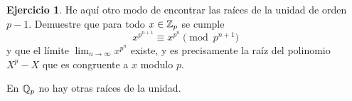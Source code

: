 \documentclass{article}
\numberwithin{equation}{section}
\theoremstyle{definition}
\newtheorem{ejerc}{Ejercicio}
\newif\ifsolutions
\begin{document}
\begin{ejerc}
  He aquí otro modo de encontrar las raíces de la unidad de orden
  $p-1$. Demuestre que para todo $x\in\mathbb{Z}_p$ se cumple
  $$x^{p^{n+1}} \equiv x^{p^n} \pmod{p^{n+1}}$$
  y que el límite $\lim_{n\to\infty} x^{p^n}$ existe, y es precisamente la raíz
  del polinomio $X^p - X$ que es congruente a $x$ modulo $p$.

  \ifsolutions\begin{solucion}
    Primero, por el pequeño teorema de Fermat,
    $$x^p \equiv x \pmod{p}.$$
    Esto implica que
    $$x^{p^{n+1}} = (x^p)^{p^n} \equiv x^{p^n} \pmod{p^{n+1}}$$
    para todo $n = 1,2,3,\ldots$ En términos de normas
    $p$-ádicas, tenemos desigualdades
    $$|x^{p^{n+1}} - x^{p^n}|_p \le \frac{1}{p^{n+1}},$$
    lo que demuestra que la sucesión es de Cauchy y su límite
    $$y = \lim_{n\to\infty} x^{p^n}$$
    existe. Tenemos $y^n = y$. En efecto,
    \[ y^p - y =
       \left(\lim_{n\to\infty} x^{p^n}\right)^p - \lim_{n\to\infty} x^{p^n} =
       \lim_{n\to\infty} (x^{p^n})^p - \lim_{n\to\infty} x^{p^n} =
       \lim_{n\to\infty} (x^{p^{n+1}} - x^{p^n}) = 0 \]
    por lo que acabamos de ver. Ahora para todo $n$
    $$x^{p^n} \equiv x \pmod{p}.$$
    ---si $n = 1$, es el pequeño teorema de Fermat, y luego por inducción
    $$x^{p^n} = (x^{p^{n-1}})^p \equiv x^p \equiv x \pmod{p}.$$
    Así que
    $$y \equiv x \pmod{p}.$$
  \end{solucion}\fi
\end{ejerc}

En $\mathbb{Q}_p$ no hay otras raíces de la unidad.
\end{document}
